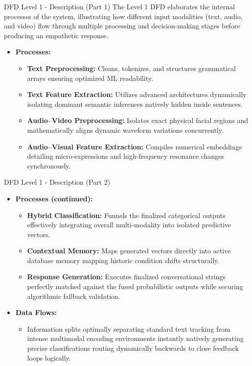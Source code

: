 \documentclass[11pt]{beamer}
\begin{document}
\begin{frame}{DFD Level 1 - Description (Part 1)}
The Level 1 DFD elaborates the internal processes of the system, illustrating how different input modalities (text, audio, and video) flow through multiple processing and decision-making stages before producing an empathetic response.

\begin{itemize}
    \item \textbf{Processes:}
    \begin{itemize}
        \item \textbf{Text Preprocessing:} Cleans, tokenizes, and structures grammatical arrays ensuring optimized ML readability.
        \item \textbf{Text Feature Extraction:} Utilizes advanced architectures dynamically isolating dominant semantic inferences natively hidden inside sentences.
        \item \textbf{Audio–Video Preprocessing:} Isolates exact physical facial regions and mathematically aligns dynamic waveform variations concurrently.
        \item \textbf{Audio–Visual Feature Extraction:} Compiles numerical embeddings detailing micro-expressions and high-frequency resonance changes synchronously.
    \end{itemize}
\end{itemize}
\end{frame}

\begin{frame}{DFD Level 1 - Description (Part 2)}
\begin{itemize}
    \item \textbf{Processes (continued):}
    \begin{itemize}
        \item \textbf{Hybrid Classification:} Funnels the finalized categorical outputs effectively integrating overall multi-modality into isolated predictive vectors.
        \item \textbf{Contextual Memory:} Maps generated vectors directly into active database memory mapping historic condition shifts structurally.
        \item \textbf{Response Generation:} Executes finalized conversational strings perfectly matched against the fused probabilistic outputs while securing algorithmic fallback validation.
    \end{itemize}
    
    \vspace{0.3cm}
    \item \textbf{Data Flows:}
    \begin{itemize}
        \item Information splits optimally separating standard text tracking from intense multimodal encoding environments instantly natively generating precise classifications routing dynamically backwards to close feedback loops logically.
    \end{itemize}
\end{itemize}
\end{frame}
\end{document}
